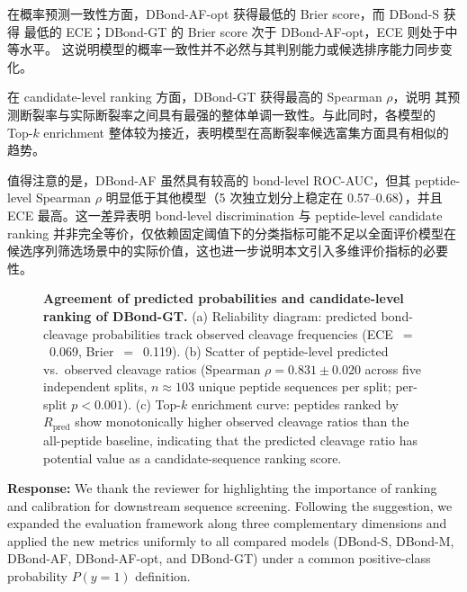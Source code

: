 在概率预测一致性方面，DBond-AF-opt 获得最低的 Brier score，而 DBond-S 获得
最低的 ECE；DBond-GT 的 Brier score 次于 DBond-AF-opt，ECE 则处于中等水平。
这说明模型的概率一致性并不必然与其判别能力或候选排序能力同步变化。

在 candidate-level ranking 方面，DBond-GT 获得最高的 Spearman $\rho$，说明
其预测断裂率与实际断裂率之间具有最强的整体单调一致性。与此同时，各模型的
Top-$k$ enrichment 整体较为接近，表明模型在高断裂率候选富集方面具有相似的
趋势。

值得注意的是，DBond-AF 虽然具有较高的 bond-level ROC-AUC，但其 peptide-level
Spearman $\rho$ 明显低于其他模型（5 次独立划分上稳定在 0.57--0.68），并且
ECE 最高。这一差异表明 bond-level discrimination 与 peptide-level candidate
ranking 并非完全等价，仅依赖固定阈值下的分类指标可能不足以全面评价模型在
候选序列筛选场景中的实际价值，这也进一步说明本文引入多维评价指标的必要性。

\begin{figure}[t]
\centering
\caption{\textbf{Agreement of predicted probabilities and candidate-level
ranking of DBond-GT.} (a) Reliability diagram: predicted bond-cleavage
probabilities track observed cleavage frequencies
(ECE~$=$~0.069, Brier~$=$~0.119). (b) Scatter of peptide-level predicted
vs.\ observed cleavage ratios (Spearman $\rho = 0.831 \pm 0.020$ across
five independent splits, $n \approx 103$ unique peptide sequences per
split; per-split $p < 0.001$). (c) Top-$k$ enrichment curve: peptides
ranked by $R_{\text{pred}}$ show monotonically higher observed cleavage
ratios than the all-peptide baseline, indicating that the predicted
cleavage ratio has potential value as a candidate-sequence ranking score.}
\label{fig:ranking}
\end{figure}

%
\textbf{Response:} We thank the reviewer for highlighting the importance of
ranking and calibration for downstream sequence screening. Following the
suggestion, we expanded the evaluation framework along three complementary
dimensions and applied the new metrics uniformly to all compared models
(DBond-S, DBond-M, DBond-AF, DBond-AF-opt, and DBond-GT) under a common
positive-class probability $P(y=1)$ definition.

